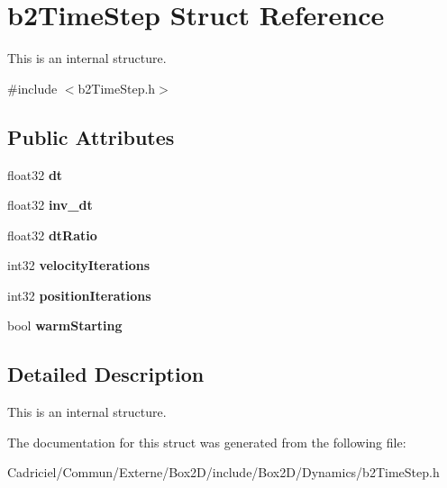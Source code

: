 \hypertarget{structb2_time_step}{}\section{b2\+Time\+Step Struct Reference}
\label{structb2_time_step}


This is an internal structure.  




{\ttfamily \#include $<$b2\+Time\+Step.\+h$>$}

\subsection*{Public Attributes}
\begin{DoxyCompactItemize}
\item 
float32 {\bfseries dt}\hypertarget{structb2_time_step_a74e20836809accba98a4445fbcb3427c}{}\label{structb2_time_step_a74e20836809accba98a4445fbcb3427c}

\item 
float32 {\bfseries inv\+\_\+dt}\hypertarget{structb2_time_step_ac2d652bde6d303149db9d0a461bc22ba}{}\label{structb2_time_step_ac2d652bde6d303149db9d0a461bc22ba}

\item 
float32 {\bfseries dt\+Ratio}\hypertarget{structb2_time_step_aa67bc8a12ffafce918d9e6a0d8d3f203}{}\label{structb2_time_step_aa67bc8a12ffafce918d9e6a0d8d3f203}

\item 
int32 {\bfseries velocity\+Iterations}\hypertarget{structb2_time_step_a9f2a0ccd8029681f254003b66f201ce1}{}\label{structb2_time_step_a9f2a0ccd8029681f254003b66f201ce1}

\item 
int32 {\bfseries position\+Iterations}\hypertarget{structb2_time_step_ab7938eec17a1a3d7961d8364e150f1be}{}\label{structb2_time_step_ab7938eec17a1a3d7961d8364e150f1be}

\item 
bool {\bfseries warm\+Starting}\hypertarget{structb2_time_step_add80f7f86c84f005ad817f0313df3f32}{}\label{structb2_time_step_add80f7f86c84f005ad817f0313df3f32}

\end{DoxyCompactItemize}


\subsection{Detailed Description}
This is an internal structure. 

The documentation for this struct was generated from the following file\+:\begin{DoxyCompactItemize}
\item 
Cadriciel/\+Commun/\+Externe/\+Box2\+D/include/\+Box2\+D/\+Dynamics/b2\+Time\+Step.\+h\end{DoxyCompactItemize}
